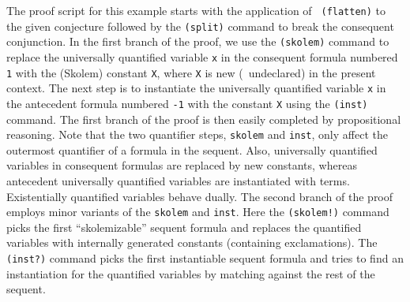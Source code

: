 The proof script for this example starts with the application of {\tt
(flatten)} to the given conjecture followed by the {\tt (split)} command
to break the consequent conjunction.  In the first branch of the proof,
we use the {\tt (skolem)} command to replace the universally quantified
variable {\tt x} in the consequent formula numbered {\tt 1} with the
(Skolem) constant {\tt X}, where {\tt X} is new (\ie\ undeclared) in the
present context.  The next step is to instantiate the universally
quantified variable {\tt x} in the antecedent formula numbered {\tt -1}
with the constant {\tt X} using the {\tt (inst)} command.  The first
branch of the proof is then easily completed by propositional reasoning.
Note that the two quantifier steps, {\tt skolem} and {\tt inst}, only
affect the outermost quantifier of a formula in the sequent.  Also,
universally quantified variables in consequent formulas are replaced by
new constants, whereas antecedent universally quantified variables are
instantiated with terms.  Existentially quantified variables behave
dually.  The second branch of the proof employs minor variants of the
{\tt skolem} and {\tt inst}.  Here the {\tt (skolem!)} command picks
the first ``skolemizable'' sequent formula and replaces the quantified
variables with internally generated constants (containing exclamations).
The {\tt (inst?)} command picks the first instantiable sequent formula
and tries to find an instantiation for the quantified variables by
matching against the rest of the sequent.

